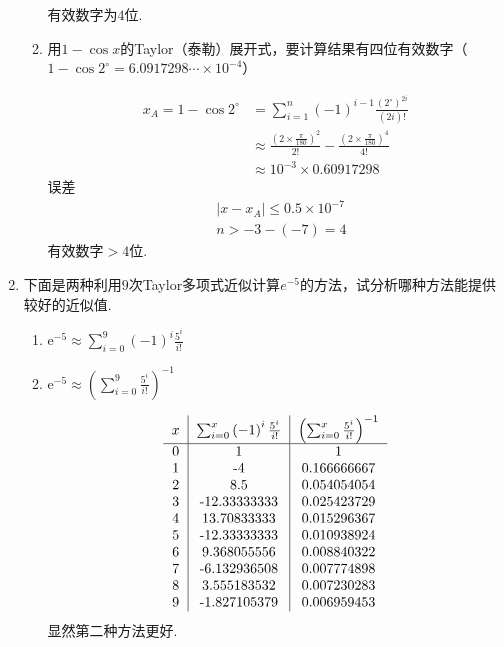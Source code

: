 \documentclass[a4paper]{article}
\begin{document}
\begin{enumerate}
\begin{enumerate}[label=（\arabic*）]
\begin{solution}
      有效数字为$4$位.
    \end{solution} 
    \item 用$1-\cos x$的Taylor（泰勒）展开式，要计算结果有四位有效数字（$1-\cos 2^\circ =6.0917298\cdots \times 10^{-4}$）
    \begin{solution}
      \begin{align*}
        x_A=1 - \cos 2^\circ &= \sum_{i=1}^n (-1)^{i-1}\frac{(2^\circ)^{2i}}{(2i)!}\\
        &\approx \frac{(2\times\frac{\pi}{180})^2}{2!}-\frac{(2\times\frac{\pi}{180})^4}{4!}\\
        &\approx 10^{-3}\times0.60917298
      \end{align*}
      误差
      \begin{align*}
        &\left |  x-x_A\right | \le 0.5\times10^{-7}\\
        &n>-3-(-7)=4
      \end{align*}
      有效数字$>4$位.
    \end{solution}
  \end{enumerate}
  

  \item 下面是两种利用$9$次Taylor多项式近似计算$e^{-5}$的方法，试分析哪种方法能提供较好的近似值.
  \begin{enumerate}[label=（\arabic*）]
    \item $\mathrm{e}^{-5}\approx\sum_{i=0}^9\left(-1\right)^i\frac{5^i}{i!}$
    \item $\mathrm{e}^{-5}\approx\left(\sum_{i=0}^9\frac{5^i}{i!}\right)^{-1}$
    \begin{solution}
      \begin{align*}
        \begin{tabular}{c|c|c} %
          $x$ & $\sum_{i=0}^x\left(-1\right)^i\frac{5^i}{i!}$ & $\left(\sum_{i=0}^x\frac{5^i}{i!}\right)^{-1}$\\
          \hline
          0	&1	&1\\
          1	&-4	&0.166666667\\
          2	&8.5	&0.054054054\\
          3	&-12.33333333	&0.025423729\\
          4	&13.70833333	&0.015296367\\
          5	&-12.33333333	&0.010938924\\
          6	&9.368055556	&0.008840322\\
          7	&-6.132936508	&0.007774898\\
          8	&3.555183532	&0.007230283\\
          9	&-1.827105379	&0.006959453
        \end{tabular}
      \end{align*}
      显然第二种方法更好.
    \end{solution}
    

\end{enumerate}
\end{enumerate}
\end{document}
